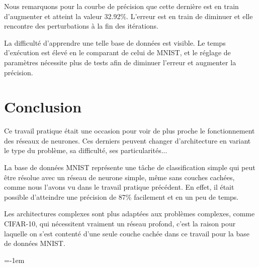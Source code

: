\documentclass[a4paper,english,12pt]{article}
\makeatletter
\newcommand{\emptypage}[1]{
  \cleardoublepage
  \begingroup
  \let\ps@plain\ps@empty
  \pagestyle{empty}
  #1
  \cleardoublepage
  \endgroup}
\makeatother
\begin{document}
Nous remarquons pour la courbe de précision que cette dernière est en train d'augmenter et atteint la valeur 32.92\%. L'erreur est en train de diminuer et elle rencontre des perturbations à la fin des itérations. 

La difficulté d'apprendre une telle base de données est visible. Le temps d'exécution est élevé en le comparant de celui de MNIST, et le réglage de paramètres nécessite plus de tests afin de diminuer l'erreur et augmenter la précision. 

\section{Conclusion}
Ce travail pratique était une occasion pour voir de plus proche le fonctionnement des réseaux de neurones. Ces derniers peuvent changer d'architecture en variant le type du problème, sa difficulté, ses particularités... 

La base de données MNIST représente une tâche de classification simple qui peut être résolue avec un réseau de neurone simple, même sans couches cachées, comme nous l'avons vu dans le travail pratique précédent. En effet, il était possible d'atteindre une précision de 87\% facilement et en un peu de temps.

Les architectures complexes sont plus adaptées aux problèmes complexes, comme CIFAR-10, qui nécessitent vraiment un réseau profond, c'est la raison pour laquelle on s'est contenté d'une seule couche cachée dans ce travail pour la base de données MNIST.

\parskip=-1em
\let\section\oldsection %
%
\end{document}

